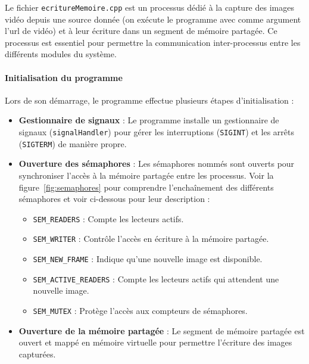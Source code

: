 \documentclass[a4paper, 11pt, french]{article}
\begin{document}
Le fichier \texttt{ecritureMemoire.cpp} est un processus dédié à la capture des images vidéo depuis une source donnée (on exécute le programme avec comme argument l'url de vidéo) et à leur écriture dans un segment de mémoire partagée. Ce processus est essentiel pour permettre la communication inter-processus entre les différents modules du système.

\paragraph{Initialisation du programme}
Lors de son démarrage, le programme effectue plusieurs étapes d'initialisation :
\begin{itemize}
    \item \textbf{Gestionnaire de signaux} : Le programme installe un gestionnaire de signaux (\texttt{signalHandler}) pour gérer les interruptions (\texttt{SIGINT}) et les arrêts (\texttt{SIGTERM}) de manière propre.
    \item \textbf{Ouverture des sémaphores} \label{par:semaphores}: Les sémaphores nommés sont ouverts pour synchroniser l'accès à la mémoire partagée entre les processus. Voir la figure~\ref{fig:semaphores} pour comprendre l’enchaînement des différents sémaphores et voir ci-dessous pour leur description :
    \begin{itemize}
        \item \texttt{SEM\_READERS} : Compte les lecteurs actifs.
        \item \texttt{SEM\_WRITER} : Contrôle l'accès en écriture à la mémoire partagée.
        \item \texttt{SEM\_NEW\_FRAME} : Indique qu'une nouvelle image est disponible.
        \item \texttt{SEM\_ACTIVE\_READERS} : Compte les lecteurs actifs qui attendent une nouvelle image.
        \item \texttt{SEM\_MUTEX} : Protège l'accès aux compteurs de sémaphores.
    \end{itemize}
    \item \textbf{Ouverture de la mémoire partagée} : Le segment de mémoire partagée est ouvert et mappé en mémoire virtuelle pour permettre l'écriture des images capturées.
\end{itemize}
\end{document}
